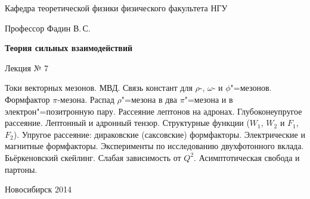 \documentclass[12pt,pagesize,paper=192mm:108mm]{scrbook}
\begin{document}
\begin{titlepage}
\begin{center}
    Кафедра теоретической физики физического факультета НГУ
    \medskip

    \Large
    Профессор Фадин В.\,С.

    \huge
    \textbf{Теория сильных взаимодействий}
    \smallskip
    
    \Large
    Лекция № 7
    \vfill
    
    \normalsize
    \begin{minipage}{0.78\linewidth}
      Токи векторных мезонов. МВД. Связь констант для $\rho$-,
      $\omega$- и $\phi$"=мезонов. Формфактор $\pi$-мезона. Распад
      $\rho$"=мезона в два $\pi$"=мезона и в электрон"=позитронную
      пару. Рассеяние лептонов на адронах. Глубоконеупругое
      рассеяние. Лептонный и адронный тензор. Структурные функции
      ($W_1$, $W_2$ и $F_1$, $F_2$). Упругое рассеяние: дираковские
      (саксовские) формфакторы. Электрические и магнитные
      формфакторы. Эксперименты по исследованию двухфотонного
      вклада. Бьёркеновский скейлинг. Слабая зависимость от
      $Q^2$. Асимптотическая свобода и партоны.
    \end{minipage}
    \vfill
    
    \normalsize \ccbysa\hspace{0.5em} Новосибирск 2014   
  \end{center}
\end{titlepage}
\end{document}
